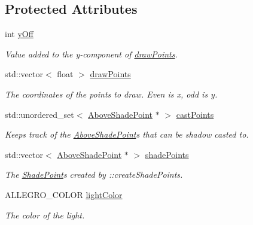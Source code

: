 \subsection*{Protected Attributes}
\begin{DoxyCompactItemize}
\item 
int \hyperlink{classlighting_1_1AboveLightSource_a558b3b3a03cdabc36a6ae73cbd41083d}{y\+Off}
\begin{DoxyCompactList}\small\item\em Value added to the y-\/component of \hyperlink{classlighting_1_1AboveLightSource_a225b94f0f210561668b94e412c66443b}{draw\+Points}. \end{DoxyCompactList}\item 
std\+::vector$<$ float $>$ \hyperlink{classlighting_1_1AboveLightSource_a225b94f0f210561668b94e412c66443b}{draw\+Points}
\begin{DoxyCompactList}\small\item\em The coordinates of the points to draw. Even is x, odd is y. \end{DoxyCompactList}\item 
std\+::unordered\+\_\+set$<$ \hyperlink{classlighting_1_1AboveShadePoint}{Above\+Shade\+Point} $\ast$ $>$ \hyperlink{classlighting_1_1AboveLightSource_a59d73c54616c32422d4cbea6b981022e}{cast\+Points}
\begin{DoxyCompactList}\small\item\em Keeps track of the \hyperlink{classlighting_1_1AboveShadePoint}{Above\+Shade\+Point}s that can be shadow casted to. \end{DoxyCompactList}\item 
std\+::vector$<$ \hyperlink{classlighting_1_1AboveShadePoint}{Above\+Shade\+Point} $\ast$ $>$ \hyperlink{classlighting_1_1AboveLightSource_a255e98bb6aae0099178cb7aa2d9671a5}{shade\+Points}
\begin{DoxyCompactList}\small\item\em The \hyperlink{classlighting_1_1ShadePoint}{Shade\+Point}s created by \+::create\+Shade\+Points. \end{DoxyCompactList}\item 
A\+L\+L\+E\+G\+R\+O\+\_\+\+C\+O\+L\+OR \hyperlink{classlighting_1_1AboveLightSource_a67835e37619d5d86023ef1fbc315546b}{light\+Color}
\begin{DoxyCompactList}\small\item\em The color of the light. \end{DoxyCompactList}\end{DoxyCompactItemize}
